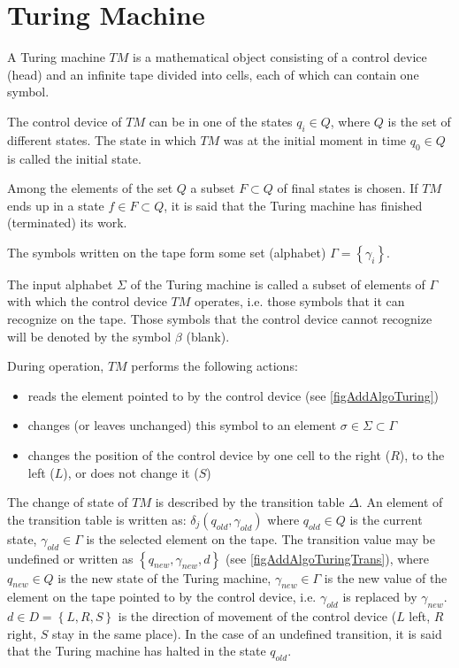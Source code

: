 \section{Turing Machine}
\label{addTuring}

A Turing machine $TM$ is a mathematical object consisting of
a control device (head) and an infinite tape divided into
cells, each of which can contain one symbol.



The control device of $TM$ can be in one of the states $q_i
\in Q$, where $Q$ 
is the set of different states. The state in which $TM$ was at
the initial moment in time $q_0 \in Q$ is called the initial state.

Among the elements of the set $Q$ a subset $F \subset Q$
of final states is chosen. If $TM$ ends up in a state $f \in F \subset
Q$, it is said that the Turing machine has finished (terminated) its work.

The symbols written on the tape form some set (alphabet)
$\Gamma = \left\{\gamma_i\right\}$.

The input alphabet $\Sigma$ of the Turing machine is called
a subset of elements of $\Gamma$ with which the control device $TM$ operates,
i.e. those symbols that it can recognize on the tape. Those symbols
that the control device cannot recognize will be denoted by the symbol
$\beta$ (blank).

During operation, $TM$ performs the following actions:
\begin{itemize}
\item{reads the element pointed to by the control device
  (see \autoref{figAddAlgoTuring})}
\item{changes (or leaves unchanged) this symbol to an element
  $\sigma \in \Sigma \subset \Gamma$}
\item{changes the position of the control device by one cell to the right
  ($R$), to the left ($L$), or does not change it ($S$)}
\end{itemize}



The change of state of $TM$ is described by the transition table
$\Delta$. An element of the transition table is written as: 
$\delta_j\left(q_{old}, \gamma_{old}\right)$ where $q_{old} \in Q$ is the current state,
$\gamma_{old} \in \Gamma$ is the selected element on the tape. The transition
value may be 
undefined or written as $\left\{q_{new}, \gamma_{new},
d\right\}$ (see \autoref{figAddAlgoTuringTrans}), where
$q_{new} \in Q$ is the new state of the Turing machine, $\gamma_{new} \in \Gamma$ is the new value of the element on the tape pointed to by the control device,
i.e. $\gamma_{old}$ is replaced by $\gamma_{new}$. $d \in D =
\left\{L, R, S\right\}$ is the direction
of movement of the control device ($L$ left, $R$ right, $S$
stay in the same place). In the case of an undefined
transition, it is said that the Turing machine has halted in the state $q_{old}$.

